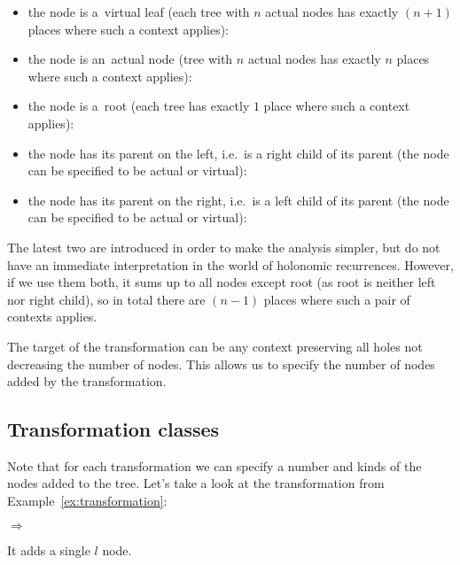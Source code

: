 \documentclass[final]{article}
\theoremstyle{definition}
\theoremstyle{definition}
\theoremstyle{remark}
\newcommand{\includeinlinescaledsvg}[3]{\begin{minipage}{#1\textwidth}\begin{center}\end{center}\end{minipage}}
\begin{document}
\begin{itemize}
    \item the node is a~virtual leaf (each tree with \(n\) actual nodes has exactly \((n + 1)\) places where such a context applies):\\
        \includeinlinescaledsvg{1}{.7}{lambda__contexts__type_001}%
    \item the node is an~actual node (tree with \(n\) actual nodes has exactly \(n\) places where such a context applies):\\
        \includeinlinescaledsvg{1}{.7}{lambda__contexts__type_002}%
    \item the node is a~root (each tree has exactly \(1\) place where such a context applies):\\
        \includeinlinescaledsvg{1}{.7}{lambda__contexts__type_003}%
    \item the node has its parent on the left, i.e.~is a right child of its parent (the node can be specified to be actual or virtual):\\
        \includeinlinescaledsvg{.5}{.7}{lambda__contexts__type_004}%
        \includeinlinescaledsvg{.5}{.7}{lambda__contexts__type_004b}%
    \item the node has its parent on the right, i.e.~is a left child of its parent (the node can be specified to be actual or virtual):\\
        \includeinlinescaledsvg{.5}{.7}{lambda__contexts__type_005}%
        \includeinlinescaledsvg{.5}{.7}{lambda__contexts__type_005b}%
\end{itemize}

The latest two are introduced in order to make the analysis simpler, but do not have an immediate interpretation in the world of holonomic recurrences. However, if we use them both, it sums up to all nodes except root (as root is neither left nor right child), so in total there are \((n - 1)\) places where such a pair of contexts applies.

The target of the transformation can be any context preserving all holes not decreasing the number of nodes. This allows us to specify the number of nodes added by the transformation.

\subsection{Transformation classes}%
\label{sub:transformation_classes}

Note that for each transformation we can specify a number and kinds of the nodes added to the tree. Let's take a look at the transformation from Example~\ref{ex:transformation}:
\begin{center}
    \includeinlinescaledsvg{.4}{.7}{lambda__contexts__def_001}%
    \(\Rightarrow\)
    \includeinlinescaledsvg{.4}{.7}{lambda__contexts__def_002_with_l}%
\end{center}
It adds a single \(l\) node.
\end{document}
